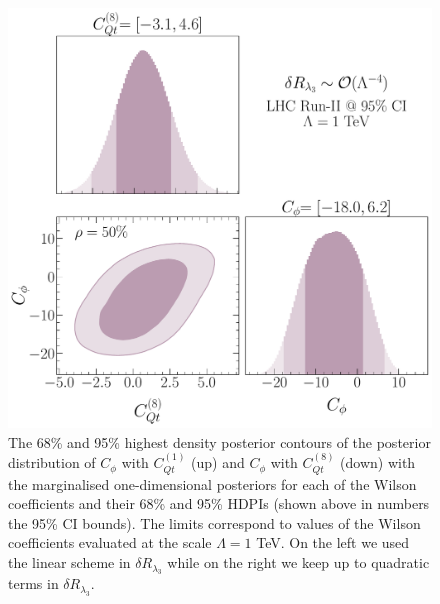 \begin{figure}[h!]
\begin{center}
		\includegraphics[width=0.45\linewidth]{fig/Cqt8_LHC_RunII_quadl3_rge} 
	\end{center}
	\caption{The 68\% and 95\% highest density posterior contours of the posterior distribution of $C_\phi$ with $C_{Qt}^{(1)}$ (up) and $C_\phi$ with $C_{Qt}^{(8)}$ (down) with the marginalised one-dimensional posteriors for each of the Wilson coefficients and their 68\% and 95\% HDPIs (shown above in numbers the 95\% CI bounds). 
		The limits correspond to values of the Wilson coefficients evaluated at the scale $\Lambda=1$ TeV.
		On the left we used the linear scheme in $\delta R_{\lambda_3}$ while on the right we keep up to quadratic terms in   $\delta R_{\lambda_3}$. \label{2param-cqt} } 
\end{figure}

